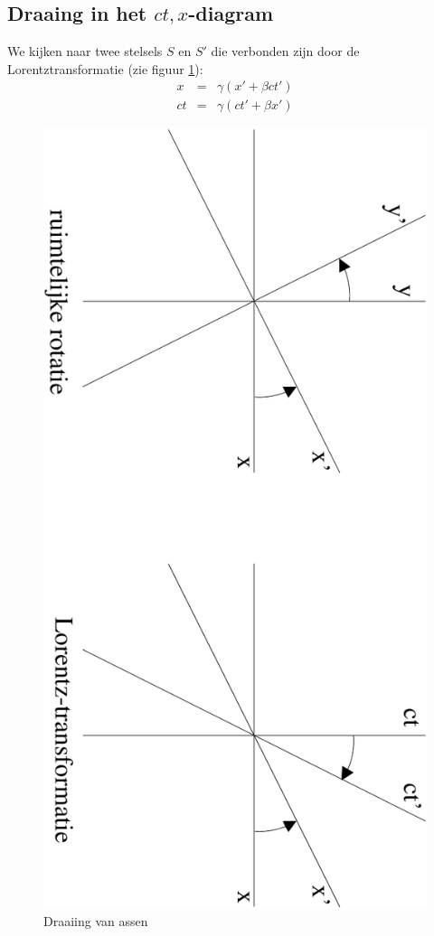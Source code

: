 \subsection{Draaing in het $ct,x$-diagram}
We kijken naar twee stelsels $S$ en $S'$ die verbonden zijn door de 
Lorentztransformatie (zie figuur \ref{f:rotate}):
\begin{eqnarray*}
   x & = & \gamma (x' + \beta ct')  \\
  ct & = & \gamma(ct'+\beta x')
\end{eqnarray*}  


\begin{figure}[ht]
\centering
\includegraphics[width=.8\textwidth]{oefeningen.pictures/oef_4/rotate}
\caption{Draaiing van assen}
\label{f:rotate}
\end{figure}

